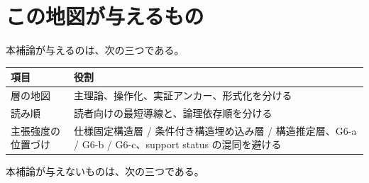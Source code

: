 \documentclass[12pt,a4paper]{article}
\begin{document}
\begin{abstract}
これは普遍法則の閉包ではない。しかし、仕様固定構造層において、\(L\) / first-moment 型の法則側座標が raw baseline と比較され、その凍結済み検証パッケージが著者環境外で同じ判定関係出力を返したという意味で、local rerun や単なる手順公開より強い package-scoped replication support である。詳細は \href{../v3/05_evidence/outside_reruns.tsv}{\texttt{../v3/05\_evidence/outside\_reruns.tsv}} と \href{../analysis/g7_route_a_true_outside_replication_summary.md}{\texttt{../analysis/g7\_route\_a\_true\_outside\_replication\_summary.md}} に置く。
\end{abstract}

\section{この地図が与えるもの}\label{ux3053ux306eux5730ux56f3ux304cux4e0eux3048ux308bux3082ux306e}

本補論が与えるのは、次の三つである。

{\def\LTcaptype{table} %
\begin{longtable}[]{@{}
  >{\raggedright\arraybackslash}p{}
  >{\raggedright\arraybackslash}p{}@{}}
\toprule\noalign{}
\begin{minipage}[b]{\linewidth}\raggedright
項目
\end{minipage} & \begin{minipage}[b]{\linewidth}\raggedright
役割
\end{minipage} \\
\midrule\noalign{}
\endhead
\bottomrule\noalign{}
\endlastfoot
層の地図 & 主理論、操作化、実証アンカー、形式化を分ける \\
読み順 & 読者向けの最短導線と、論理依存順を分ける \\
主張強度の位置づけ & 仕様固定構造層 / 条件付き構造埋め込み層 / 構造推定層、G6-a / G6-b / G6-c、support status の混同を避ける \\
\end{longtable}
}

本補論が与えないものは、次の三つである。
\end{document}

